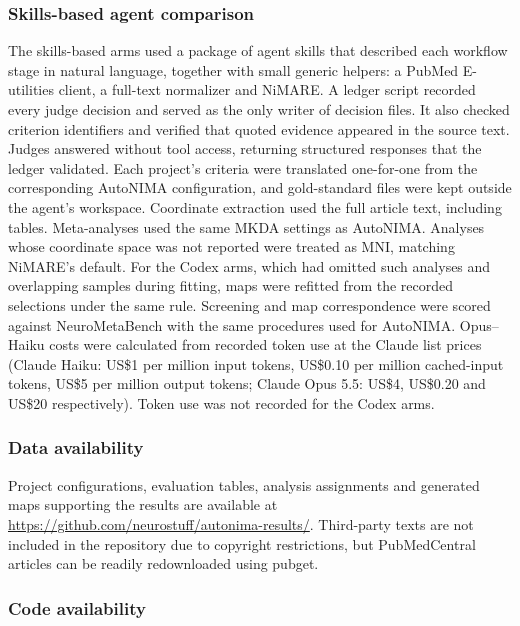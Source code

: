 \subsubsection{Skills-based agent comparison}

The skills-based arms used a package of agent skills that described each workflow stage in natural language, together with small generic helpers: a PubMed E-utilities client, a full-text normalizer and NiMARE. A ledger script recorded every judge decision and served as the only writer of decision files. It also checked criterion identifiers and verified that quoted evidence appeared in the source text. Judges answered without tool access, returning structured responses that the ledger validated. Each project's criteria were translated one-for-one from the corresponding AutoNIMA configuration, and gold-standard files were kept outside the agent's workspace. Coordinate extraction used the full article text, including tables. Meta-analyses used the same MKDA settings as AutoNIMA. Analyses whose coordinate space was not reported were treated as MNI, matching NiMARE's default. For the Codex arms, which had omitted such analyses and overlapping samples during fitting, maps were refitted from the recorded selections under the same rule. Screening and map correspondence were scored against NeuroMetaBench with the same procedures used for AutoNIMA. Opus--Haiku costs were calculated from recorded token use at the Claude list prices (Claude Haiku: US\$1 per million input tokens, US\$0.10 per million cached-input tokens, US\$5 per million output tokens; Claude Opus 5.5: US\$4, US\$0.20 and US\$20 respectively). Token use was not recorded for the Codex arms.

\subsubsection{Data availability}

Project configurations, evaluation tables, analysis assignments and generated maps supporting the results are available at \url{https://github.com/neurostuff/autonima-results/}. Third-party texts are not included in the repository due to copyright restrictions, but PubMedCentral articles can be readily redownloaded using pubget.

\subsubsection{Code availability}

